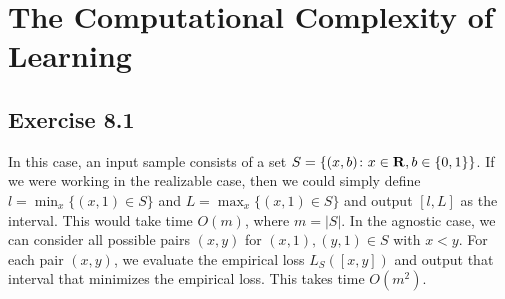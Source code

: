 \chapter{The Computational Complexity of Learning}

\section*{Exercise 8.1}

In this case, an input sample consists of a set 
$S = \{(x, b) \colon x \in \mathbf{R}, b \in \{0, 1\}\}$. If we were working in 
the realizable case, then we could simply define 
$l = \min_{x} \{ (x, 1) \in S \}$ and
$L = \max_{x} \{ (x, 1) \in S \}$ and output $[l, L]$ as the interval. 
This would take time $O(m)$, where $m = |S|$. In the agnostic case, 
we can consider all possible pairs $(x, y)$ for $(x, 1), (y, 1) \in S$
with $x < y$.
For each pair $(x, y)$, we evaluate the empirical loss $L_S([x, y])$ 
and output that interval that minimizes the empirical loss. This takes 
time $O(m^2)$.


